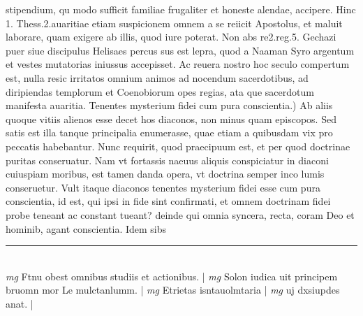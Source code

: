 \documentclass{article}
\begin{document}
\begin{pages}
stipendium, qu modo sufficit familiae frugaliter et honeste alendae, accipere. Hinc 1. Thess.2.auaritiae etiam suspicionem omnem a se reiicit Apostolus, et maluit laborare, quam exigere ab illis, quod iure poterat. Non abs re2.reg.5. Gechazi puer siue discipulus Helisaes percus sus est lepra, quod a Naaman Syro argentum et vestes mutatorias iniussus accepisset. Ac reuera nostro hoc seculo compertum est, nulla resic irritatos omnium animos ad nocendum sacerdotibus, ad diripiendas templorum et Coenobiorum opes regias, ata que sacerdotum manifesta auaritia.  \pend\pstart Tenentes mysterium fidei cum pura conscientia.) Ab aliis quoque vitiis alienos esse decet hos diaconos, non minus quam episcopos. Sed satis est illa tanque principalia enumerasse, quae etiam a quibusdam vix pro peccatis habebantur. Nunc requirit, quod praecipuum est, et per quod doctrinae puritas conseruatur. Nam vt fortassis naeuus aliquis conspiciatur in diaconi cuiuspiam moribus, est tamen danda opera, vt doctrina semper inco lumis conseruetur. Vult itaque diaconos tenentes mysterium fidei esse cum pura conscientia, id est, qui ipsi in fide sint confirmati, et omnem doctrinam fidei probe teneant ac constant tueant? deinde qui omnia syncera, recta, coram Deo et hominib, agant conscientia. Idem sibs  \pend
\vspace{0.5cm}\noindent
\vspace{0.2cm}\rule{1cm}{0.2pt}\\ 
\hspace{0.2cm}\textit{mg}
\footnotesize Ftnu obest omnibus studiis et actionibus. 
\normalsize| 
\hspace{0.2cm}\textit{mg}
\footnotesize Solon iudica uit principem bruomn mor Le mulctanlumm. 
\normalsize| 
\hspace{0.2cm}\textit{mg}
\footnotesize Etrietas isntauolmtaria 
\normalsize| 
\hspace{0.2cm}\textit{mg}
\footnotesize uj dxsiupdes anat. 
\normalsize| 

\end{pages}
\end{document}
